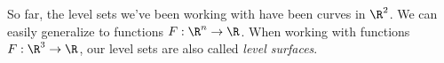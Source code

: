 \documentclass{ximera}
\begin{document}
So far, the level sets we've been working with have been curves in
$\R^2$. We can easily generalize to functions $F:\R^n \to \R$.  When
working with functions $F:\R^3\to\R$, our level sets are also called
\textit{level surfaces}.  




%
\end{document}
